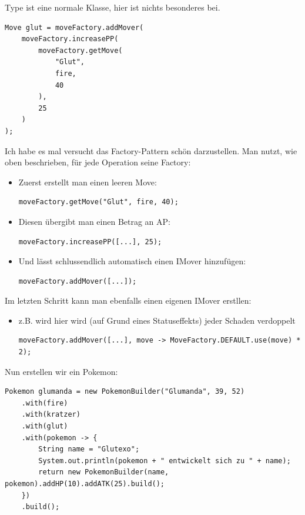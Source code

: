 \documentclass{article}
\begin{document}
\begin{enumerate}[label=\alph*.]
            Type ist eine normale Klasse, hier ist nichts besonderes bei.\\

            \begin{verbatim}
Move glut = moveFactory.addMover(
    moveFactory.increasePP(
        moveFactory.getMove(
            "Glut",
            fire,
            40
        ),
        25
    )
);
            \end{verbatim}

            Ich habe es mal versucht das Factory-Pattern schön darzustellen.
            Man nutzt, wie oben beschrieben, für jede Operation seine Factory:

            \begin{itemize}
                \item Zuerst erstellt man einen leeren Move:
                    \begin{verbatim}
moveFactory.getMove("Glut", fire, 40);
                    \end{verbatim}

                \item Diesen übergibt man einen Betrag an AP:
                    \begin{verbatim}
moveFactory.increasePP([...], 25);
                    \end{verbatim}

                \item Und lässt schlussendlich automatisch einen IMover hinzufügen:
                \begin{verbatim}
moveFactory.addMover([...]);
                \end{verbatim}
            \end{itemize}

            Im letzten Schritt kann man ebenfalls einen eigenen IMover erstllen:

            \begin{itemize}
                \item z.B. wird hier wird (auf Grund eines Statuseffekts) jeder Schaden verdoppelt
                \begin{verbatim}
moveFactory.addMover([...], move -> MoveFactory.DEFAULT.use(move) * 2);
                \end{verbatim}
            \end{itemize}

            Nun erstellen wir ein Pokemon:
            \begin{verbatim}
Pokemon glumanda = new PokemonBuilder("Glumanda", 39, 52)
    .with(fire)
    .with(kratzer)
    .with(glut)
    .with(pokemon -> {
        String name = "Glutexo";
        System.out.println(pokemon + " entwickelt sich zu " + name);
        return new PokemonBuilder(name, pokemon).addHP(10).addATK(25).build();
    })
    .build();
            \end{verbatim}


\end{enumerate}
\end{document}
